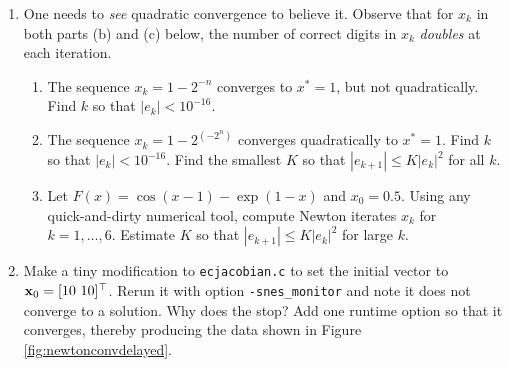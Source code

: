 \renewcommand{\labelenumi}{\arabic{chapter}.\arabic{enumi}\quad}
\renewcommand{\labelenumii}{(\alph{enumii})}
\begin{enumerate}
\item One needs to \emph{see} quadratic convergence to believe it.  Observe that for $x_k$ in both parts (b) and (c) below, the number of correct digits in $x_k$ \emph{doubles} at each iteration.
    \begin{enumerate}
    \item The sequence $x_k = 1-2^{-n}$ converges to $x^*=1$, but not quadratically.  Find $k$ so that $|e_k| < 10^{-16}$.
    \item The sequence $x_k = 1-2^{(-2^n)}$ converges quadratically to $x^*=1$.  Find $k$ so that $|e_k| < 10^{-16}$.  Find the smallest $K$ so that $|e_{k+1}| \le K |e_k|^2$ for all $k$.
    \item Let $F(x) = \cos(x-1) - \exp(1-x)$ and $x_0=0.5$.  Using any quick-and-dirty numerical tool, compute Newton iterates $x_k$ for $k=1,\dots,6$.  Estimate $K$ so that $|e_{k+1}| \le K |e_k|^2$ for large $k$.
    \end{enumerate}

\item Make a tiny modification to \texttt{ecjacobian.c} to set the initial vector to $\mathbf{x}_0 = [10\,\, 10]^\top$.  Rerun it with option \texttt{-snes\_monitor} and note it does not converge to a solution.  Why does the \pSNES stop?  Add one runtime option so that it  converges, thereby producing the data shown in Figure \ref{fig:newtonconvdelayed}.


\end{enumerate}
